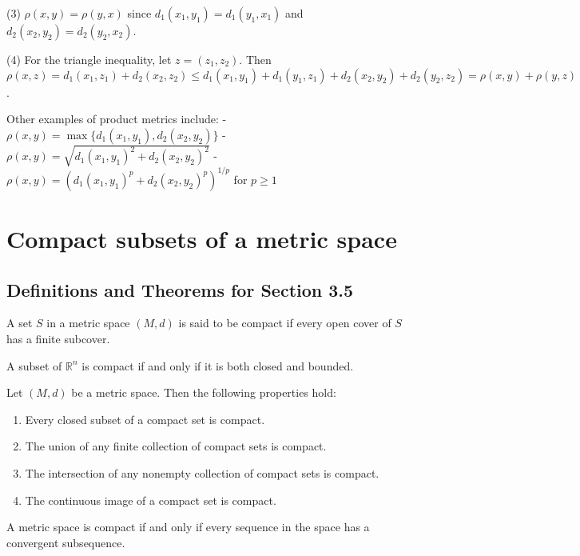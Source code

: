 (3) $\rho(x,y) = \rho(y,x)$ since $d_1(x_1,y_1) = d_1(y_1,x_1)$ and $d_2(x_2,y_2) = d_2(y_2,x_2)$.

(4) For the triangle inequality, let $z = (z_1,z_2)$. Then $\rho(x,z) = d_1(x_1,z_1) + d_2(x_2,z_2) \leq d_1(x_1,y_1) + d_1(y_1,z_1) + d_2(x_2,y_2) + d_2(y_2,z_2) = \rho(x,y) + \rho(y,z)$.

Other examples of product metrics include:
- $\rho(x,y) = \max\{d_1(x_1,y_1), d_2(x_2,y_2)\}$
- $\rho(x,y) = \sqrt{d_1(x_1,y_1)^2 + d_2(x_2,y_2)^2}$
- $\rho(x,y) = (d_1(x_1,y_1)^p + d_2(x_2,y_2)^p)^{1/p}$ for $p \geq 1$


\section{Compact subsets of a metric space}

\subsection*{Definitions and Theorems for Section 3.5}

\begin{definition}
A set $S$ in a metric space $(M,d)$ is said to be compact if every open cover of $S$ has a finite subcover.
\end{definition}

\begin{theorem}
A subset of $\mathbb{R}^n$ is compact if and only if it is both closed and bounded.
\end{theorem}

\begin{theorem}
Let $(M,d)$ be a metric space. Then the following properties hold:
\begin{enumerate}
\item Every closed subset of a compact set is compact.
\item The union of any finite collection of compact sets is compact.
\item The intersection of any nonempty collection of compact sets is compact.
\item The continuous image of a compact set is compact.
\end{enumerate}
\end{theorem}

\begin{theorem}
A metric space is compact if and only if every sequence in the space has a convergent subsequence.
\end{theorem}

